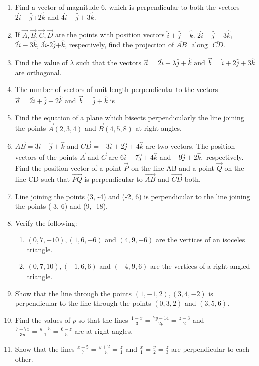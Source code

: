 \begin{enumerate}[label=\thesubsection.\arabic*, ref=\thesubsection.\theenumi]
\item Find a vector of magnitude 6,  which is perpendicular to both the vectors $2\hat{i}-\hat{j}$+$2\hat{k}$ and $4\hat{i}-\hat{j}+3\hat{k}$.
\item If $\vec{A}, \vec{B}, \vec{C}, \vec{D}$  are the points with position vectors $\hat{i}+\hat{j}-\hat{k}$,  $2\hat{i}-\hat{j}+3\hat{k}$,  $2\hat{i}-3\hat{k}$,  $3\hat{i}$-$2\hat{j}$+$\hat{k}$,  respectively,  find the projection of $\overline{AB}$ $\text{ along }$ $\overline{CD}$.
\item Find the value of $\lambda$ such that the vectors $\vec{a}=2\hat{i}+\lambda\hat{j}+\hat{k}$ $\text{and}$ $\vec{b}=\hat{i}+2\hat{j}+3\hat{k}$ are orthogonal.
\item The number of vectors of unit length perpendicular to the vectors $\vec{a}=2\hat{i}+\hat{j}+2\hat{k}$  and  $\vec{b}=\hat{j}+\hat{k}$ is
\item Find the equation of a plane which  bisects perpendicularly the line joining the points $\vec{A}(2, 3, 4)$ and $\vec{B}(4, 5, 8)$ at right angles.
\item $\overrightarrow{AB}=3\hat{i}-\hat{j}+\hat{k}$ and $\overrightarrow{CD}=-3\hat{i}+2\hat{j}+4\hat{k}$ are two vectors. The position vectors of the points $\vec{A}$ and $\vec{C}$ are $6\hat{i}+7\hat{j}+4\hat{k}$ and $-9\hat{j}+2\hat{k}, $ respectively. Find the position vector of a point $\vec{P}$ on the line AB and a point $\vec{Q}$ on the line CD such that $\overrightarrow{PQ}$ is perpendicular to $\overrightarrow{AB}$ and $\overrightarrow{CD}$ both.
\item Line joining the points (3, -4) and (-2, 6) is perpendicular to the line joining the points (-3, 6) and (9, -18).
\item Verify the following:
\begin{enumerate}
\item $(0, 7, -10),  (1, 6, -6)$ and $(4, 9, -6)$ are the vertices of an isoceles triangle.
\item $(0, 7, 10),  (-1, 6, 6)$ and $(-4, 9, 6)$ are the vertices of a right angled triangle.
\end{enumerate}
\item  Show that the line through the points $(1, -1, 2), (3, 4, -2 )$ is perpendicular to the line through the points $(0, 3, 2)$ and $(3, 5, 6)$.
\item Find the values of $p$ so that the lines $ \frac{1-x}{3}=\frac{7y-14}{2p}=\frac{z-3}{2}$ and $ \frac{7-7x}{3p}=\frac{y-5}{1}=\frac{6-z}{5}$ are at right angles.
\item Show that the lines $ \frac{x-5}{7}=\frac{y+2}{-5}=\frac{z}{1}$ and $ \frac{x}{1}=\frac{y}{2}=\frac{z}{3}$ are perpendicular to each other.

\end{enumerate}
